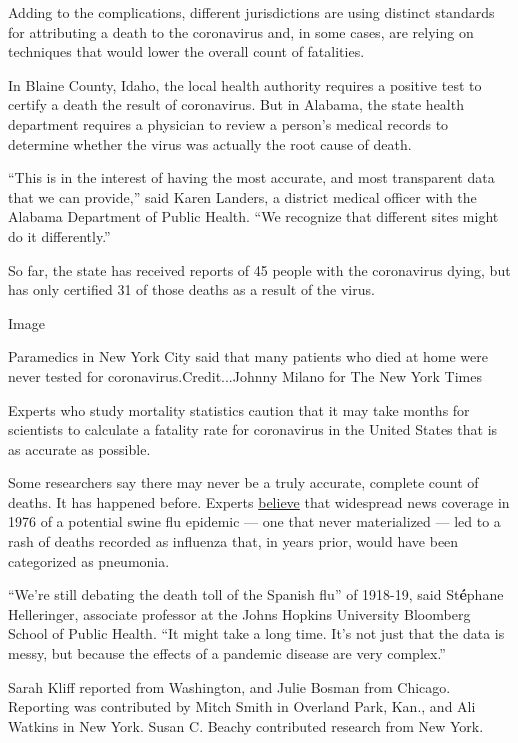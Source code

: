 Adding to the complications, different jurisdictions are using distinct
standards for attributing a death to the coronavirus and, in some cases,
are relying on techniques that would lower the overall count of
fatalities.

In Blaine County, Idaho, the local health authority requires a positive
test to certify a death the result of coronavirus. But in Alabama, the
state health department requires a physician to review a person's
medical records to determine whether the virus was actually the root
cause of death.

``This is in the interest of having the most accurate, and most
transparent data that we can provide,'' said Karen Landers, a district
medical officer with the Alabama Department of Public Health. ``We
recognize that different sites might do it differently.''

So far, the state has received reports of 45 people with the coronavirus
dying, but has only certified 31 of those deaths as a result of the
virus.

Image

Paramedics in New York City said that many patients who died at home
were never tested for coronavirus.Credit...Johnny Milano for The New
York Times

Experts who study mortality statistics caution that it may take months
for scientists to calculate a fatality rate for coronavirus in the
United States that is as accurate as possible.

Some researchers say there may never be a truly accurate, complete count
of deaths. It has happened before. Experts
\href{https://www.ncbi.nlm.nih.gov/pmc/articles/PMC3827586/}{believe}
that widespread news coverage in 1976 of a potential swine flu epidemic
--- one that never materialized --- led to a rash of deaths recorded as
influenza that, in years prior, would have been categorized as
pneumonia.

``We're still debating the death toll of the Spanish flu'' of 1918-19,
said St\textbf{é}phane Helleringer, associate professor at the Johns
Hopkins University Bloomberg School of Public Health. ``It might take a
long time. It's not just that the data is messy, but because the effects
of a pandemic disease are very complex.''

Sarah Kliff reported from Washington, and Julie Bosman from Chicago.
Reporting was contributed by Mitch Smith in Overland Park, Kan., and Ali
Watkins in New York. Susan C. Beachy contributed research from New York.


